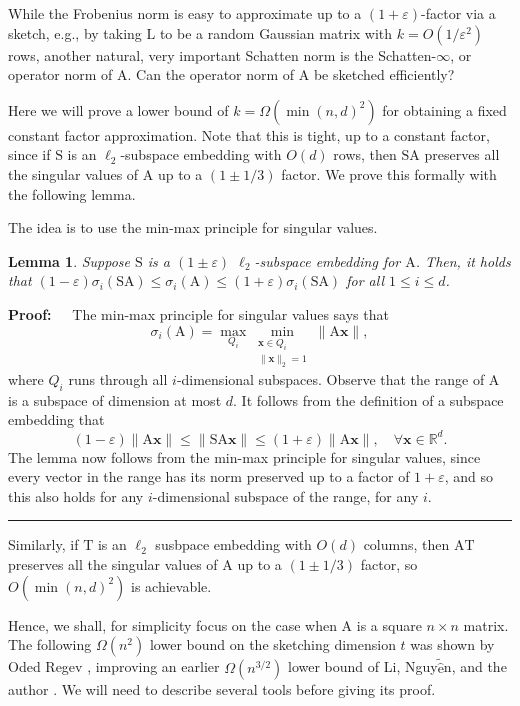 \documentclass[11pt]{article}
\newtheorem{lemma}[theorem]{Lemma}
\newenvironment{proof}{\begin{trivlist} \item {\bf Proof:~~}}
  {\qed\end{trivlist}}
\newcommand{\mat}[1]{{\ensuremath{\bm{\mathrm{#1}}}}}
\def\matA{\mat{A}}
\def\matL{\mat{L}}
\def\matS{\mat{S}}
\def\matT{\mat{T}}
\def\qed{\hfill\rule{2mm}{2mm}}
\def\x{{\mathbf x}}
\newcommand{\eps}{\varepsilon}
\begin{document}
While the Frobenius norm is easy to approximate up to a $(1+\eps)$-factor 
via a sketch, e.g., by taking $\matL$ to be a random Gaussian matrix with
$k = O(1/\eps^2)$ rows, another natural, very important Schatten norm is the Schatten-$\infty$, or operator norm
of $\matA$. Can the operator norm of $\matA$ be sketched efficiently?

Here we will prove a lower bound of $k = \Omega(\min(n,d)^2)$ for obtaining a fixed constant factor approximation.
Note that this is tight, up to a constant factor, since if $\matS$ is an $\ell_2$-subspace embedding with $O(d)$
rows, then $\matS \matA$ preserves all the singular values of $\matA$ up to a $(1 \pm 1/3)$ factor. We prove this formally 
with the following lemma.

The idea is to use the min-max principle for singular values. 
	\begin{lemma}\label{lem:interlace}
Suppose $\matS$ is a $(1 \pm \varepsilon)$ $\ell_2$-subspace embedding for $\matA$.  
Then, 
it holds that $(1-\varepsilon)\sigma_i(\matS \matA)\leq \sigma_i(\matA)\leq (1+\varepsilon)\sigma_i(\matS \matA)$ for all $1\leq i\leq d$.
	\end{lemma}
\begin{proof}
The min-max principle for singular values says that
\[
\sigma_i(\matA) = \max_{Q_i} \min_{\substack{\x\in Q_i\\ \|\x\|_2=1}} \|\matA\x\|,
\]
where $Q_i$ runs through all $i$-dimensional subspaces. 
Observe that the range of $\matA$ is a subspace of dimension at most $d$. It follows from the definition of a subspace embedding that 
\[
(1-\varepsilon)\|\matA\x\|\leq \|\matS \matA\x\| \leq (1+\varepsilon)\|\matA\x\|,\quad \forall \x\in\mathbb{R}^d.
\]
The lemma now follows from the min-max principle for singular values, since every vector in the range
has its norm preserved up to a factor of $1+\eps$, and so this also holds for any $i$-dimensional subspace
of the range, for any $i$. 
\end{proof}
Similarly, if $\matT$
is an $\ell_2$ susbpace embedding with $O(d)$ columns, then $\matA \matT$ preserves all the singular values of $\matA$
up to a $(1 \pm 1/3)$ factor, so $O(\min(n,d)^2)$ is achievable. 

Hence, we shall, for simplicity focus on the case when $\matA$ is a square $n \times n$ matrix. The following
$\Omega(n^2)$ lower bound on the sketching dimension $t$ was shown by Oded Regev \cite{r14}, improving an 
earlier $\Omega(n^{3/2})$ lower bound of Li, Nguy$\tilde{\hat{\mbox{e}}}$n, and the author \cite{lnw14}. We will need to describe
several tools before giving its proof. 
\end{document}
